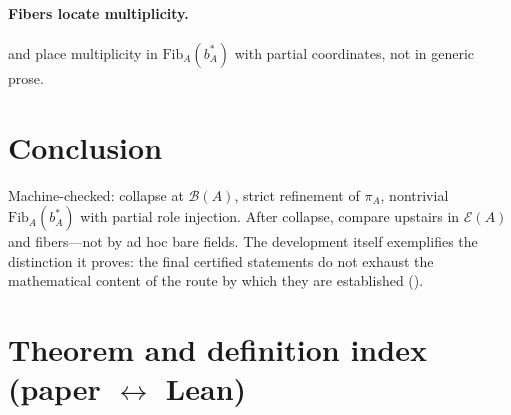 \documentclass[11pt]{article}
\begin{document}
\paragraph{Fibers locate multiplicity.}
 and  place multiplicity in $\mathrm{Fib}_A(b^\ast_A)$ with partial coordinates, not in generic prose.

\section{Conclusion}\label{sec:conclusion}
Machine-checked: collapse at $\mathcal{B}(A)$, strict refinement of $\pi_A$, nontrivial $\mathrm{Fib}_A(b^\ast_A)$ with partial role injection. After collapse, compare upstairs in $\mathcal{E}(A)$ and fibers---not by ad hoc bare fields. The development itself exemplifies the distinction it proves: the final certified statements do not exhaust the mathematical content of the route by which they are established ().

\appendix

\section[Theorem index (paper and Lean)]{Theorem and definition index (paper \texorpdfstring{$\leftrightarrow$}{<->} Lean)}\label{app:theorem-index}
\end{document}
